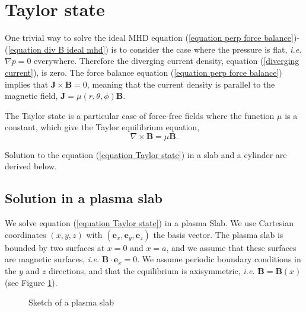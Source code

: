 \documentclass[my_thesis.tex]{subfiles}
\begin{document}
\section{Taylor state}
\label{section taylor state}
One trivial way to solve the ideal MHD equation (\ref{equation perp force balance})-(\ref{equation div B ideal mhd}) is to consider the case where the pressure is flat, \textit{i.e.} $\nabla p=0$ everywhere. Therefore the diverging current density, equation (\ref{diverging current}), is zero. The force balance equation (\ref{equation perp force balance}) implies that $\mathbf{J}\times\mathbf{B}=0$, meaning that the current density is parallel to the magnetic field, $\mathbf{J}=\mu(r,\theta,\phi)\mathbf{B}$.

The Taylor state \citep{Taylor1974,Taylor1986} is a particular case of force-free fields where the function $\mu$ is a constant, which give the Taylor equilibrium equation,
\begin{equation}
	\nabla\times\mathbf{B}=\mu\mathbf{B}. \label{equation Taylor state}
\end{equation}

Solution to the equation (\ref{equation Taylor state}) in a slab and a cylinder are derived below.

\subsection{Solution in a plasma slab}
We solve equation (\ref{equation Taylor state}) in a plasma Slab. We use Cartesian coordinates $(x,y,z)$ with $(\mathbf{e}_x,\mathbf{e}_y,\mathbf{e}_z)$ the basis vector. The plasma slab is bounded by two surfaces at $x=0$ and $x=a$, and we assume that these surfaces are magnetic surfaces, \textit{i.e.} $\mathbf{B}\cdot\mathbf{e}_x=0$. We assume periodic boundary conditions in the $y$ and $z$ directions, and that the equilibrium is axisymmetric, \textit{i.e.} $\mathbf{B}=\mathbf{B}(x)$ (see Figure \ref{fig. plasma slab}).

\begin{figure}
	\centering
	\caption{Sketch of a plasma slab}
	\label{fig. plasma slab}
\end{figure}
\end{document}
